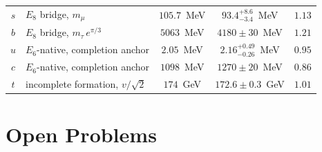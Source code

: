 \documentclass[11pt,a4paper]{article}
\theoremstyle{definition}\newtheorem{definition}[theorem]{Definition}
\theoremstyle{remark}
\begin{document}
\begin{table}[htbp]
\begin{tabular}{clccc}
$s$ & $E_8$ bridge, $m_\mu$             & $105.7$~MeV & $93.4^{+8.6}_{-3.4}$~MeV   & $1.13$ \\
$b$ & $E_8$ bridge, $m_\tau\,e^{\pi/3}$ & $5063$~MeV  & $4180\pm30$~MeV            & $1.21$ \\
$u$ & $E_6$-native, completion anchor   & $2.05$~MeV  & $2.16^{+0.49}_{-0.26}$~MeV & $0.95$ \\
$c$ & $E_6$-native, completion anchor   & $1098$~MeV  & $1270\pm20$~MeV            & $0.86$ \\
$t$ & incomplete formation, $v/\sqrt2$  & $174$~GeV   & $172.6\pm0.3$~GeV          & $1.01$ \\
\hline
\end{tabular}
\end{table}

\section{Open Problems}
\label{P20:sec:open}
\end{document}
